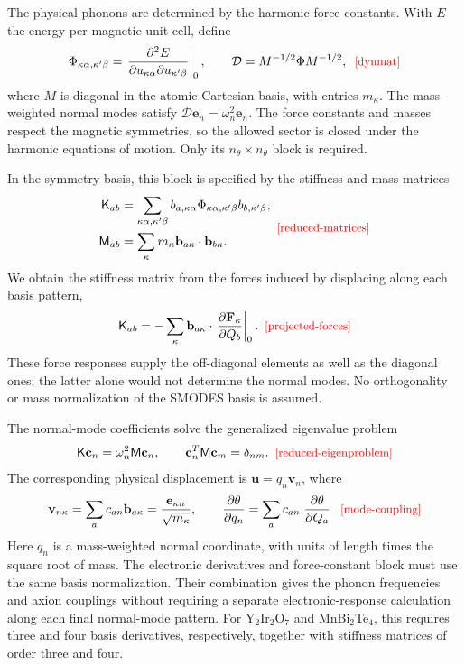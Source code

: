 \documentclass[galley,aps,pra,10pt,amsmath,amssymb,
    superscriptaddress,nofootinbib,longbibliography]{revtex4-2}
\def\Red#1{\textcolor{red}{#1}}
\newcounter{comm}
\newcommand{\eqlab}[1]{\Red{\hbox{\small\;\;[#1]}}\label{eq:#1}}
\newcommand{\eqlab}[1]{\label{eq:#1}}
\newcommand{\code}[1]{\textsc{#1}}
\newcommand{\MBT}{MnBi$_2$Te$_4$}
\newcommand{\YIO}{Y$_2$Ir$_2$O$_7$}
\begin{document}
The physical phonons are determined by the harmonic force constants. With $E$ the energy per magnetic unit cell, define
\begin{equation}
\Phi_{\kappa\alpha,\kappa'\beta}
=\left.\frac{\partial^2 E}
{\partial u_{\kappa\alpha}\partial u_{\kappa'\beta}}\right|_0,
\qquad
\mathcal D=M^{-1/2}\Phi M^{-1/2},
\eqlab{dynmat}
\end{equation}
where $M$ is diagonal in the atomic Cartesian basis, with entries $m_\kappa$. The mass-weighted normal modes satisfy $\mathcal D\mathbf e_n=\omega_n^2\mathbf e_n$. The force constants and masses respect the magnetic symmetries, so the allowed sector is closed under the harmonic equations of motion. Only its $n_\theta\times n_\theta$ block is required.

In the symmetry basis, this block is specified by the stiffness and mass matrices
\begin{equation}
\begin{aligned}
\mathsf K_{ab}
&=\sum_{\kappa\alpha,\kappa'\beta}
b_{a,\kappa\alpha}\Phi_{\kappa\alpha,\kappa'\beta}
b_{b,\kappa'\beta},\\
\mathsf M_{ab}
&=\sum_\kappa m_\kappa
\mathbf b_{a\kappa}\cdot\mathbf b_{b\kappa}.
\end{aligned}
\eqlab{reduced-matrices}
\end{equation}
We obtain the stiffness matrix from the forces induced by displacing along each basis pattern,
\begin{equation}
\mathsf K_{ab}
=-\sum_\kappa\mathbf b_{a\kappa}\cdot
\left.\frac{\partial\mathbf F_\kappa}{\partial Q_b}\right|_0.
\eqlab{projected-forces}
\end{equation}
These force responses supply the off-diagonal elements as well as the diagonal ones; the latter alone would not determine the normal modes. No orthogonality or mass normalization of the \code{SMODES} basis is assumed.

The normal-mode coefficients solve the generalized eigenvalue problem
\begin{equation}
\mathsf K\mathbf c_n=\omega_n^2\mathsf M\mathbf c_n,
\qquad
\mathbf c_n^T\mathsf M\mathbf c_m=\delta_{nm}.
\eqlab{reduced-eigenproblem}
\end{equation}
The corresponding physical displacement is $\mathbf u=q_n\mathbf v_n$, where
\begin{equation}
\mathbf v_{n\kappa}=\sum_a c_{an}\mathbf b_{a\kappa}
=\frac{\mathbf e_{\kappa n}}{\sqrt{m_\kappa}},
\qquad
\frac{\partial\theta}{\partial q_n}
=\sum_a c_{an} \left.\frac{\partial\theta}{\partial Q_a}\right .
\eqlab{mode-coupling}
\end{equation}
Here $q_n$ is a mass-weighted normal coordinate, with units of length times the square root of mass. The electronic derivatives and force-constant block must use the same basis normalization. Their combination gives the phonon frequencies and axion couplings without requiring a separate electronic-response calculation along each final normal-mode pattern. For \YIO{} and \MBT{}, this requires three and four basis derivatives, respectively, together with stiffness matrices of order three and four.
\end{document}
